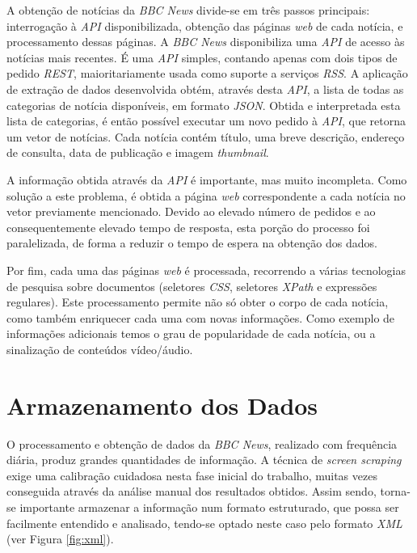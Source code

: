 \documentclass[twocolumn,twoside,10pt,a4paper]{article}
\begin{document}
A obtenção de notícias da \textit{BBC News} divide-se em três passos principais: interrogação à \textit{API} disponibilizada, obtenção das páginas \textit{web} de cada notícia, e processamento dessas páginas.
A \textit{BBC News} disponibiliza uma \textit{API} de acesso às notícias mais recentes. É uma \textit{API} simples, contando apenas com dois tipos de pedido \textit{REST}, maioritariamente usada como suporte a serviços \textit{RSS}. A aplicação de extração de dados desenvolvida obtém, através desta \textit{API}, a lista de todas as categorias de notícia disponíveis, em formato \textit{JSON}. Obtida e interpretada esta lista de categorias, é então possível executar um novo pedido à \textit{API}, que retorna um vetor de notícias. Cada notícia contém título, uma breve descrição, endereço de consulta, data de publicação e imagem \textit{thumbnail}.

A informação obtida através da \textit{API} é importante, mas muito incompleta. Como solução a este problema, é obtida a página \textit{web} correspondente a cada notícia no vetor previamente mencionado. Devido ao elevado número de pedidos e ao consequentemente elevado tempo de resposta, esta porção do processo foi paralelizada, de forma a reduzir o tempo de espera na obtenção dos dados.

Por fim, cada uma das páginas \textit{web} é processada, recorrendo a várias tecnologias de pesquisa sobre documentos (seletores \textit{CSS}, seletores \textit{XPath} e expressões regulares). Este processamento permite não só obter o corpo de cada notícia, como também enriquecer cada uma com novas informações. Como exemplo de informações adicionais temos o grau de popularidade de cada notícia, ou a sinalização de conteúdos vídeo/áudio.

\section{Armazenamento dos Dados}\label{sec:store}

O processamento e obtenção de dados da \textit{BBC News}, realizado com frequência diária, produz grandes quantidades de informação. A técnica de \textit{screen scraping} exige uma calibração cuidadosa nesta fase inicial do trabalho, muitas vezes conseguida através da análise manual dos resultados obtidos. Assim sendo, torna-se importante armazenar a informação num formato estruturado, que possa ser facilmente entendido e analisado, tendo-se optado neste caso pelo formato \textit{XML} (ver Figura \ref{fig:xml}).
\end{document}
